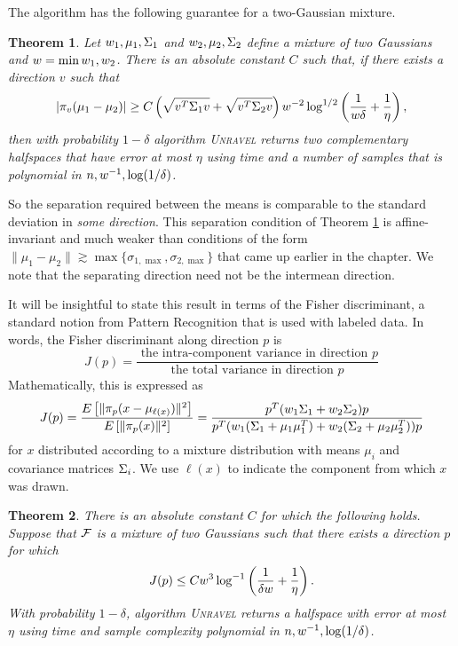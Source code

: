 \documentclass{book}
\newtheorem{theorem}{Theorem}[chapter]
\numberwithin{exercise}{chapter}
\begin{document}
{The algorithm has the following guarantee for a two-Gaussian mixture.

\begin{theorem}\label{thrm:k=2-sep}
Let $w_1,{\mu}_1,{\Sigma}_1$ and $w_2,{\mu}_2,{\Sigma}_2$ define a mixture of
two Gaussians and $w = \min w_1,w_2$.  There is an absolute constant $C$ such that, if there
exists a direction $v$ such that
\[
|\pi_v (\mu_1 - \mu_2)| \geq C \left(\sqrt{v^T{\Sigma}_1v} + \sqrt{v^T{\Sigma}_2v}\right)
w^{-2} \log ^{1/2}\left( \frac{1}{w \delta} + \frac{1}{\eta}\right),
\]
then with probability $1-\delta$ algorithm \textsc{Unravel} returns
two complementary halfspaces that have error at most $\eta$ using
time and a number of samples that is polynomial in
$n,w^{-1},\log (1/\delta)$.
\end{theorem}
So the separation required between the means is comparable to the
standard deviation in {\em some direction}. This separation condition
of Theorem \ref{thrm:k=2-sep} is affine-invariant and much weaker than
conditions of the form $\| \mu_1 - \mu_2\| \gtrsim
\max\{\sigma_{1,\max}, \sigma_{2,\max}\}$ that came up earlier in the chapter.
We note that the separating direction need not be the intermean direction.

It will be insightful to state this result in terms of the Fisher
discriminant, a standard notion from Pattern Recognition
\cite{Duda2001,Fukunaga1990} that is used with labeled data.  In
words, the Fisher discriminant along direction $p$ is
\[
J(p) = \frac{\mbox{ the intra-component variance in direction $p$}}
{\mbox{the total variance in direction $p$}}
\]
Mathematically, this is expressed as
\[
J(p) = \frac{E\left[\| \pi_p(x - {\mu}_{\ell(x)})\|^2 \right]}
{E\left[\| \pi_p(x) \|^2 \right]} =
\frac{p^T( w_1 {\Sigma}_1 + w_2 {\Sigma}_2)p}
{p^T(w_1 ({\Sigma}_1 + {\mu}_1{\mu}_1^T) + w_2 ({\Sigma}_2 + {\mu}_2{\mu}_2^T))p}
\]
for $x$ distributed according to a mixture distribution with means
$\mu_i$ and covariance matrices ${\Sigma}_i$.  We use $\ell(x)$ to indicate
the component from which $x$ was drawn.

\begin{theorem}\label{thrm:k=2-fisher}
There is an absolute constant $C$ for which the following holds.
Suppose that ${\mathcal{F}}$ is a mixture of two Gaussians such that there
exists a direction $p$ for which
\[
J(p) \leq C w^3 \log^{-1} \left(\frac{1}{\delta w} +
\frac{1}{\eta}\right).
\]
With probability $1-\delta$, algorithm \textsc{Unravel} returns a
halfspace with error at most $\eta$  using time and sample complexity
polynomial in $n,w^{-1},\log(1/\delta)$.
\end{theorem}

}
\end{document}
